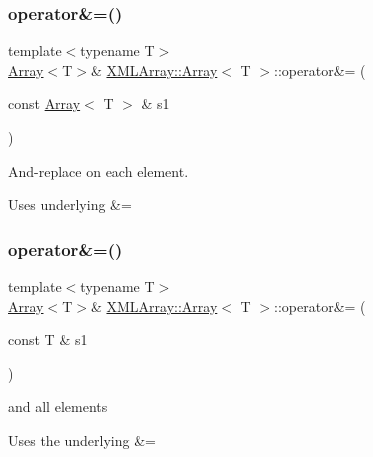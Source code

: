 \subsubsection{\texorpdfstring{operator\&=()}{operator\&=()}\hspace{0.1cm}{\footnotesize\ttfamily [3/6]}}
{\footnotesize\ttfamily template$<$typename T$>$ \\
\mbox{\hyperlink{classXMLArray_1_1Array}{Array}}$<$T$>$\& \mbox{\hyperlink{classXMLArray_1_1Array}{X\+M\+L\+Array\+::\+Array}}$<$ T $>$\+::operator\&= (\begin{DoxyParamCaption}\item[{const \mbox{\hyperlink{classXMLArray_1_1Array}{Array}}$<$ T $>$ \&}]{s1 }\end{DoxyParamCaption})\hspace{0.3cm}{\ttfamily [inline]}}



And-\/replace on each element. 

Uses underlying \&= \mbox{\label{classXMLArray_1_1Array_a7f264e277398588e0e37763573f48fc7}} 
\subsubsection{\texorpdfstring{operator\&=()}{operator\&=()}\hspace{0.1cm}{\footnotesize\ttfamily [4/6]}}
{\footnotesize\ttfamily template$<$typename T$>$ \\
\mbox{\hyperlink{classXMLArray_1_1Array}{Array}}$<$T$>$\& \mbox{\hyperlink{classXMLArray_1_1Array}{X\+M\+L\+Array\+::\+Array}}$<$ T $>$\+::operator\&= (\begin{DoxyParamCaption}\item[{const T \&}]{s1 }\end{DoxyParamCaption})\hspace{0.3cm}{\ttfamily [inline]}}



and all elements 

Uses the underlying \&= \mbox{\label{classXMLArray_1_1Array_a7f264e277398588e0e37763573f48fc7}} 
